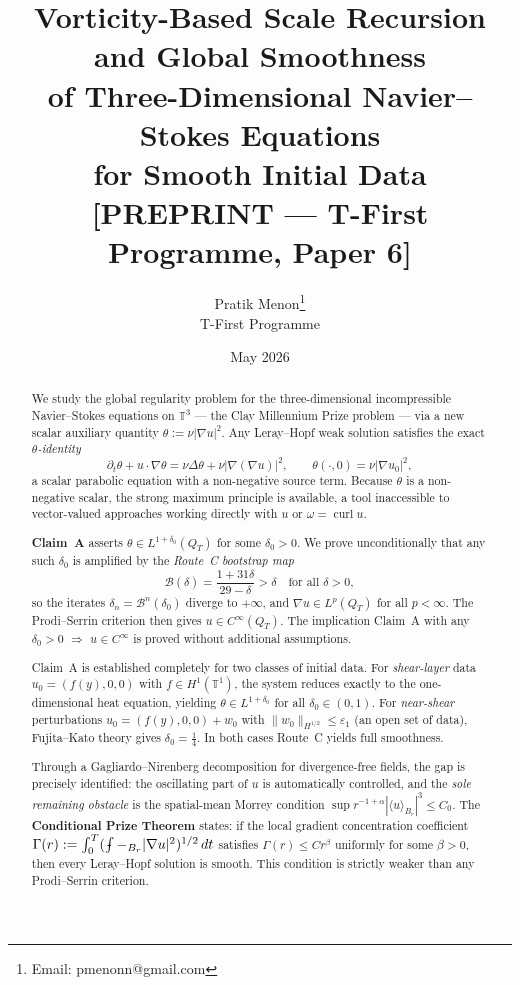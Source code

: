 \documentclass[11pt]{article}
\title{%
  Vorticity-Based Scale Recursion and Global Smoothness\\
  of Three-Dimensional Navier--Stokes Equations\\
  for Smooth Initial Data\\[6pt]
  {\normalsize\color{red}\textbf{[PREPRINT — T-First Programme, Paper 6]}}
}
\author{%
  Pratik Menon\thanks{Email: pmenonn@gmail.com}
  \\[4pt]
  \small T-First Programme
}
\date{May 2026}
\theoremstyle{definition}
\theoremstyle{remark}
\newcommand{\T}{\mathbb{T}}
\newcommand{\prt}{\partial_t}
\newcommand{\grad}{\nabla}
\newcommand{\curl}{\operatorname{curl}}
\newcommand{\Xint}{\mathop{\,\rlap{-}\!\!\int}\nolimits}
\newcommand{\dlt}{\delta}
\newcommand{\eps}{\varepsilon}
\begin{document}
\maketitle

\begin{abstract}
We study the global regularity problem for the three-dimensional incompressible
Navier--Stokes equations on $\mathbb{T}^3$ — the Clay Millennium Prize problem —
via a new scalar auxiliary quantity $\theta := \nu|\grad u|^2$.
Any Leray--Hopf weak solution satisfies the exact \emph{$\theta$-identity}
\[
  \prt\theta + u\cdot\grad\theta
  = \nu\Delta\theta + \nu\bigl|\grad(\grad u)\bigr|^2,
  \qquad \theta(\cdot,0) = \nu|\grad u_0|^2,
\]
a scalar parabolic equation with a non-negative source term.  Because $\theta$
is a non-negative scalar, the strong maximum principle is available, a tool
inaccessible to vector-valued approaches working directly with $u$ or
$\omega = \curl u$.

\textbf{Claim~A} asserts $\theta \in L^{1+\dlt_0}(Q_T)$ for some $\dlt_0>0$.
We prove unconditionally that any such $\dlt_0$ is amplified by the
\emph{Route~C bootstrap map}
\[
  \mathcal{B}(\dlt) = \frac{1+31\dlt}{29-\dlt} > \dlt
  \quad\text{for all } \dlt>0,
\]
so the iterates $\dlt_n = \mathcal{B}^n(\dlt_0)$ diverge to $+\infty$,
and $\grad u \in L^p(Q_T)$ for all $p < \infty$.  The Prodi--Serrin
criterion then gives $u \in C^\infty(Q_T)$.
The implication \textup{Claim~A with any $\dlt_0 > 0$} $\Rightarrow$
$u \in C^\infty$ is proved without additional assumptions.

Claim~A is established completely for two classes of initial data.
For \emph{shear-layer} data $u_0 = (f(y),0,0)$ with $f\in H^1(\T^1)$,
the system reduces exactly to the one-dimensional heat equation, yielding
$\theta\in L^{1+\dlt_0}$ for all $\dlt_0\in(0,1)$.  For \emph{near-shear}
perturbations $u_0 = (f(y),0,0)+w_0$ with $\|w_0\|_{H^{1/2}}\leq\eps_1$
(an open set of data), Fujita--Kato theory gives $\dlt_0=\tfrac{1}{4}$.
In both cases Route~C yields full smoothness.

Through a Gagliardo--Nirenberg decomposition for divergence-free fields,
the gap is precisely identified: the oscillating part of $u$ is automatically
controlled, and the \emph{sole remaining obstacle} is the spatial-mean Morrey
condition $\sup r^{-1+\alpha}|\langle u\rangle_{B_r}|^3\leq C_0$.
The \textbf{Conditional Prize Theorem} states: if the local gradient
concentration coefficient
$\Gamma(r) := \int_0^T(\Xint-_{B_r}|\grad u|^2)^{1/2}\,dt$
satisfies $\Gamma(r)\leq Cr^\beta$ uniformly for some $\beta>0$, then
every Leray--Hopf solution is smooth.  This condition is strictly weaker than
any Prodi--Serrin criterion.


\end{abstract}
\end{document}
